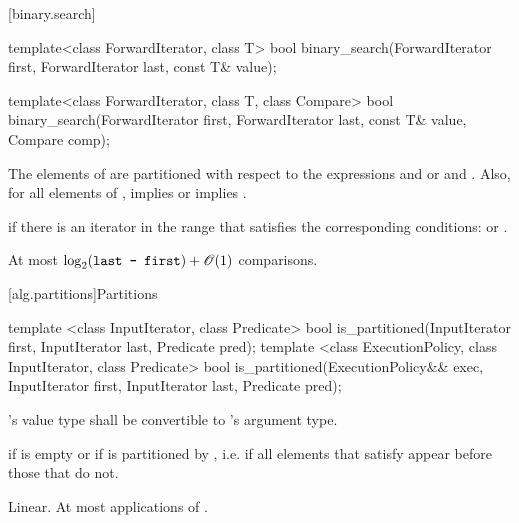 [binary.search]{}

%
\begin{itemdecl}
template<class ForwardIterator, class T>
  bool binary_search(ForwardIterator first, ForwardIterator last,
                     const T& value);

template<class ForwardIterator, class T, class Compare>
  bool binary_search(ForwardIterator first, ForwardIterator last,
                     const T& value, Compare comp);
\end{itemdecl}

\begin{itemdescr}
\pnum
\requires
The elements
of
are partitioned with respect to the expressions
and
or
and
.
Also, for all elements
of
\tcode{[first, last)},
implies
or
implies
.

\pnum
\returns
{}
if there is an iterator
in the range
that satisfies the corresponding conditions:
or
.

\pnum
\complexity
At most
$\log_2(\texttt{last - first}) + \mathscr{O}(1)$
comparisons.
\end{itemdescr}

[alg.partitions]{Partitions}

%
\begin{itemdecl}
template <class InputIterator, class Predicate>
  bool is_partitioned(InputIterator first, InputIterator last, Predicate pred);
template <class ExecutionPolicy, class InputIterator, class Predicate>
  bool is_partitioned(ExecutionPolicy&& exec,
                      InputIterator first, InputIterator last, Predicate pred);
\end{itemdecl}

\begin{itemdescr}
\pnum
\requires {}'s value type shall be convertible to 's argument type.

\pnum
\returns {} if
 is empty or if
 is partitioned by , i.e. if all elements that satisfy  appear before those that do not.

\pnum
\complexity Linear. At most  applications of .
\end{itemdescr}

